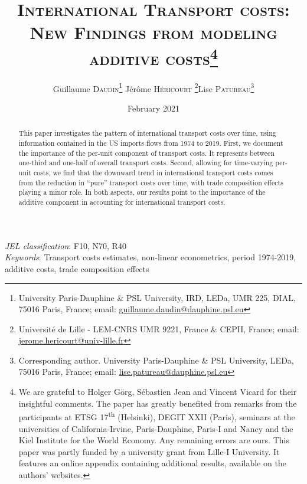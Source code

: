 \documentclass[a4paper,11pt]{article}
\begin{document}
\title{\textsc{International Transport costs:\\New Findings from modeling additive costs}\thanks{We are grateful to Holger G\"{o}rg, S\'{e}bastien Jean and Vincent Vicard for their insightful comments. The paper has greatly benefited from remarks from the participants at ETSG 17\textsuperscript{th} (Helsinki), DEGIT XXII (Paris), seminars at the universities of California-Irvine, Paris-Dauphine, Paris-I and Nancy and the Kiel Institute for the World Economy.
Any remaining errors are ours. This paper was partly funded by a university grant from Lille-I University. It features an online appendix containing additional results, available on the authors' websites.}}

\author{Guillaume \textsc{Daudin}\thanks{%
University Paris-Dauphine \& PSL University, IRD, LEDa, UMR 225, DIAL, 75016 Paris, France; email: \url{guillaume.daudin@dauphine.psl.eu}}  \qquad J\'{e}r\^{o}me \textsc{H\'{e}ricourt} \thanks{Universit\'{e} de Lille - LEM-CNRS UMR 9221, France \& CEPII, France; email: \url{jerome.hericourt@univ-lille.fr}}\qquad Lise \textsc{Patureau}\thanks{Corresponding author.
University Paris-Dauphine \& PSL University, LEDa, 75016 Paris, France;  email: \url{lise.patureau@dauphine.psl.eu} } }


\date{February 2021}
 \maketitle
\bigskip

\begin{abstract}
This paper investigates the pattern of international transport costs over time, using information contained in the US imports flows from 1974 to 2019. First, we document the importance of the per-unit component of transport costs. It represents between one-third and one-half of overall transport costs. Second, allowing for time-varying per-unit costs, we find that the downward trend in international transport costs comes from the reduction in ``pure'' transport costs over time, with trade composition effects playing a minor role. In both aspects, our results point to the importance of the additive component in accounting for international transport costs.
\end{abstract}


\thispagestyle{empty} \pagestyle{plain} \setcounter{page}{1}

\bigskip


\noindent \emph{JEL classification}: F10, N70, R40 \\
\noindent \emph{Keywords}: Transport costs estimates, non-linear econometrics, period 1974-2019, additive costs, trade composition effects
\end{document}
